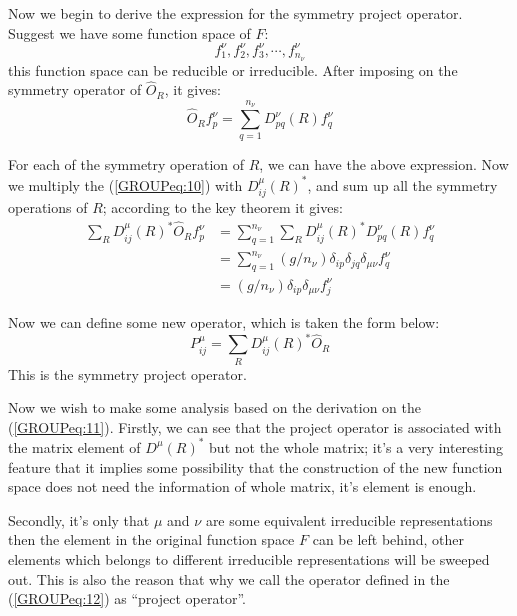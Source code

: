 Now we begin to derive the expression for the symmetry project
operator. Suggest we have some function space of $F$:
\begin{equation}\label{}
  f^{\nu}_{1}, f^{\nu}_{2}, f^{\nu}_{3}, \cdots, f^{\nu}_{n_{\nu}}
\end{equation}
this function space can be reducible or irreducible. After imposing on
the symmetry operator of $\hat{O}_{R}$, it gives:
\begin{equation}\label{GROUPeq:10}
  \hat{O}_{R}f^{\nu}_{p} =
  \sum_{q=1}^{n_{\nu}}D^{\nu}_{pq}(R)f^{\nu}_{q}
\end{equation}

For each of the symmetry operation of $R$, we can have the above
expression. Now we multiply the (\ref{GROUPeq:10}) with
$D^{\mu}_{ij}(R)^{*}$, and sum up all the symmetry operations of $R$;
according to the key theorem it gives:
\begin{align}\label{GROUPeq:11}
  \sum_{R}D^{\mu}_{ij}(R)^{*}\hat{O}_{R}f^{\nu}_{p} &=
  \sum_{q=1}^{n_{\nu}}\sum_{R}D^{\mu}_{ij}(R)^{*}
  D^{\nu}_{pq}(R)f^{\nu}_{q} \nonumber \\
  &=\sum_{q=1}^{n_{\nu}}(g/n_{\nu})\delta_{ip}
  \delta_{jq}\delta_{\mu\nu}f^{\nu}_{q} \nonumber \\
  &=(g/n_{\nu})\delta_{ip}\delta_{\mu\nu}f^{\nu}_{j}
\end{align}

Now we can define some new operator, which is taken the form below:
\begin{equation}\label{GROUPeq:12}
  P^{\mu}_{ij} = \sum_{R}D^{\mu}_{ij}(R)^{*}\hat{O}_{R}
\end{equation}
This is the symmetry project operator.

Now we wish to make some analysis based on the derivation on the
(\ref{GROUPeq:11}). Firstly, we can see that the project operator is
associated with the matrix element of $D^{\mu}(R)^{*}$ but not the
whole matrix; it's a very interesting feature that it implies some
possibility that the construction of the new function space does not
need the information of whole matrix, it's element is enough.

Secondly, it's only that $\mu$ and $\nu$ are some equivalent
irreducible representations then the element in the original function
space $F$ can be left behind, other elements which belongs to
different irreducible representations will be sweeped out. This is
also the reason that why we call the operator defined in the
(\ref{GROUPeq:12}) as ``project operator''.

